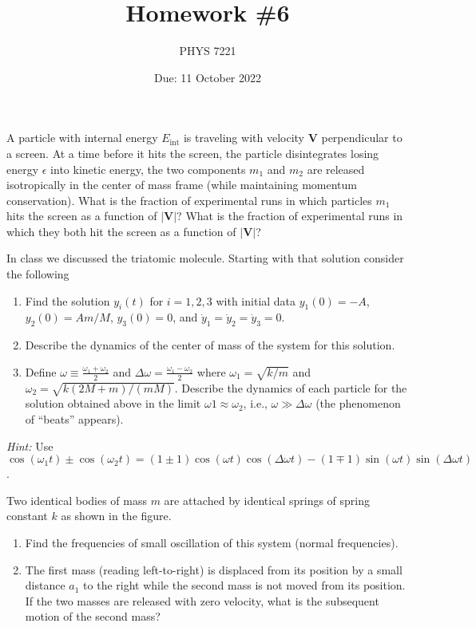 \documentclass{jhwhw}
\author{PHYS 7221}
\title{Homework \#6}
\date{Due: 11 October 2022}
\begin{document}

A particle with internal energy $E_{\mathrm{int}}$ is traveling with velocity $\mathbf V$ perpendicular to a screen.
At a time before it hits the screen, the particle disintegrates losing energy $\epsilon$ into kinetic energy, the two components $m_{1}$ and $m_{2}$ are released isotropically in the center of mass frame (while maintaining momentum conservation).
What is the fraction of experimental runs in which particles $m_{1}$ hits the screen as a function of $|\mathbf V|$?
What is the fraction of experimental runs in which they both hit the screen as a function of $|\mathbf V|$?


In class we discussed the triatomic molecule. Starting with that solution consider the following
\begin{enumerate}
  \item Find the solution $y_{i}(t)$ for $i=1,2,3$ with initial data $y_{1}(0) = -A$, $y_{2}(0) = Am/M$, $y_{3}(0) = 0$, and $\dot y_{1} = \dot y_{2} = \dot y_{3} = 0$.
  \item Describe the dynamics of the center of mass of the system for this solution.
  \item Define $\omega \equiv \frac{\omega_{1} + \omega_{2}}2$ and $\Delta \omega = \frac{\omega_{1} - \omega_{2}}2$ where $\omega_{1} = \sqrt{k/m}$ and $\omega_{2} = \sqrt{k (2M +m)/(mM)}$. Describe the dynamics of each particle for the solution obtained above in the limit $\omega1 \approx \omega_{2}$, i.e., $\omega \gg \Delta \omega$ (the phenomenon of ``beats'' appears).
\end{enumerate}

\emph{Hint: } Use $\cos(\omega_{1} t) \pm \cos(\omega_{2} t) = (1 \pm 1) \cos(\omega t) \cos(\Delta \omega t) - (1 \mp 1) \sin(\omega t) \sin(\Delta \omega t)$.

  Two identical bodies of mass $m$ are attached by identical springs of spring constant $k$ as shown in the figure.
\begin{enumerate}
  \item Find the frequencies of small oscillation of this system (normal frequencies).
  \item The first mass (reading left-to-right) is displaced from its position by a small distance $a_{1}$ to the right while the second mass is not moved from its position. If the two masses are released with zero velocity, what is the subsequent motion of the second mass?
\end{enumerate}
\end{document}

